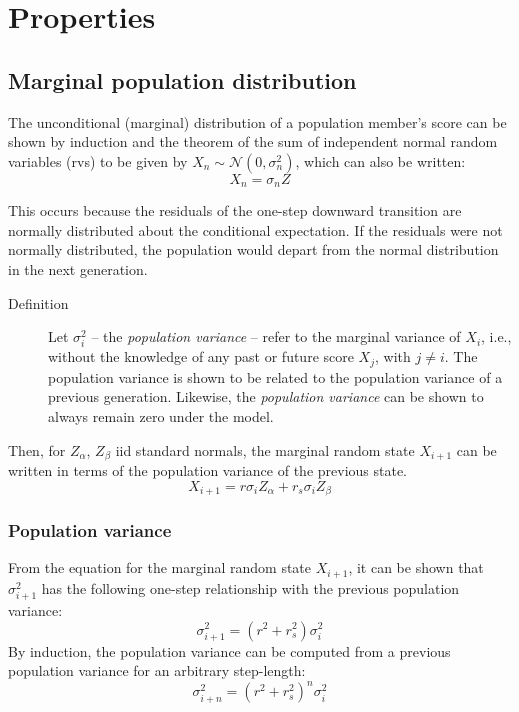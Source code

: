 \documentclass[letterpaper,10pt]{article} %
\begin{document}





\section{Properties}
\subsection{Marginal population distribution}
The unconditional (marginal) distribution of a population member's score can be shown by induction and the theorem of the sum of independent normal random variables (rvs) to be given by $X_n \sim \mathcal{N}(0, \sigma_n^2)$, which can also be written:
$$X_n = \sigma_nZ$$

This occurs because the residuals of the one-step downward transition are normally distributed about the conditional expectation. If the residuals were not normally distributed, the population would depart from the normal distribution in the next generation.

\begin{description}
\item [Definition] Let $\sigma_i^2$ -- the \emph{population variance} -- refer to the marginal variance of $X_i$, i.e., without the knowledge of any past or future score $X_{j}$, with $j \neq i$. The population variance is shown to be related to the population variance of a previous generation. Likewise, the \emph{population variance} can be shown to always remain zero under the model. 
\end{description}

Then, for $Z_\alpha$, $Z_\beta$ iid standard normals, the marginal random state $X_{i+1}$ can be written in terms of the population variance of the previous state.
$$X_{i+1} = r\sigma_iZ_\alpha + r_s\sigma_iZ_\beta$$

\subsubsection*{Population variance}
From the equation for the marginal random state $X_{i+1}$, it can be shown that $\sigma_{i+1}^2$ has the following one-step relationship with the previous population variance:
$$\sigma_{i+1}^2 = (r^2+r_s^2)  \sigma_i^2$$
By induction, the population variance can be computed from a previous population variance for an arbitrary step-length:
$$\sigma_{i+n}^2 = (r^2+r_s^2)^n  \sigma_{i}^2$$
\end{document}
